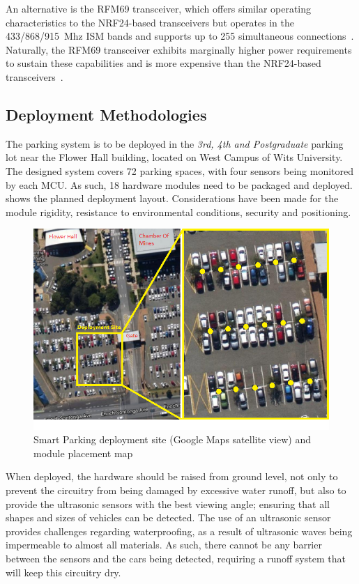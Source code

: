 \documentclass[10pt,twocolumn]{witseiepaper}
\begin{document}
			An alternative is the RFM69 transceiver, which offers similar operating characteristics to the NRF24-based transceivers but operates in the 433/868/915~Mhz ISM bands and supports up to 255 simultaneous connections~\cite{rfm69}. Naturally, the RFM69 transceiver exhibits marginally higher power requirements to sustain these capabilities and is more expensive than the NRF24-based transceivers~\cite{rfm69}.
	
	\subsection{Deployment Methodologies}
		The parking system is to be deployed in the \textit{3rd, 4th and Postgraduate} parking lot near the Flower Hall building, located on West Campus of Wits University. The designed system covers 72 parking spaces, with four sensors being monitored by each MCU. As such, 18 hardware modules need to be packaged and deployed.  shows the planned deployment layout. Considerations have been made for the module rigidity, resistance to environmental conditions, security and positioning.
		
		\begin{figure}
			\centering
			\includegraphics[width=1\columnwidth]{media/deploymentSite.png}
			\caption{Smart Parking deployment site (Google Maps satellite view) and module placement map}
			\raggedright
			\label{fig:deployment}
		\end{figure}
	
		When deployed, the hardware should be raised from ground level, not only to prevent the circuitry from being damaged by excessive water runoff, but also to provide the ultrasonic sensors with the best viewing angle; ensuring that all shapes and sizes of vehicles can be detected. The use of an ultrasonic sensor provides challenges regarding waterproofing, as a result of ultrasonic waves being impermeable to almost all materials. As such, there cannot be any barrier between the sensors and the cars being detected, requiring a runoff system that will keep this circuitry dry. 
		
\end{document}
